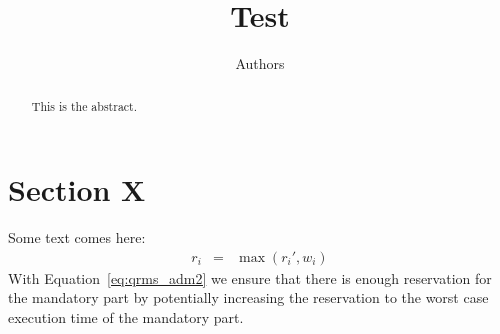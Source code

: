 \documentclass{article}
\title{Test}
\author{Authors}
\date{}
\begin{document}
\maketitle

\begin{abstract}
  This is the abstract.
  
\end{abstract}

\section{Section X}
\label{sec:x}

Some text comes here:
\begin{eqnarray}
  r_{i} & = & \max({r_{i}}',w_{i})  \label{eq:qrms_adm2}
\end{eqnarray}
With Equation~\ref{eq:qrms_adm2} we ensure that there is enough
reservation for the mandatory part by potentially increasing the
reservation to the worst case execution time of the mandatory part.
\end{document}

